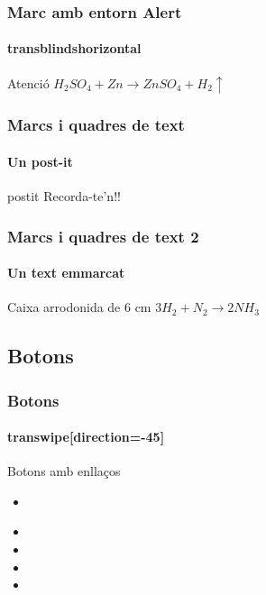 \documentclass[12pt]{beamer}
\begin{document}
\begin{frame}
  \frametitle{Marc amb entorn Alert}
    \framesubtitle{transblindshorizontal}

      \begin{alertblock}{Atenció}
           $H_2 SO_4 + Zn \rightarrow ZnSO_4 + H_2\uparrow $
      \end{alertblock}
\transblindshorizontal
\end{frame}

\begin{frame}
  \frametitle{Marcs i quadres de text}
    \framesubtitle{Un post-it}
      \begin{beamercolorbox}[sep=1em,wd=5cm,shadow=true,rounded=true]{postit}
            \centering            
            Recorda-te'n!!
      \end{beamercolorbox}
\end{frame}
     
\begin{frame}
  \frametitle{Marcs i quadres de text 2}
    \framesubtitle{Un text emmarcat}     
      \begin{beamerboxesrounded}[upper=block body,lower=block body,shadow=true,width=6cm]{Caixa arrodonida de 6 cm}
       \centering
             $3 H_2 + N_2 \rightarrow 2 NH_3$
      \end{beamerboxesrounded}

  \transwipe[direction=90]
\end{frame}


\subsection{Botons}
\begin{frame}
  \frametitle{Botons}
    \framesubtitle{transwipe[direction=-45]}
    \begin{block}{Botons amb enllaços}
           \begin{itemize}
					\item \href{http://phobos.xtec.cat/jqueralt}{}
		            \item {}
		            \item {}
		            \item {}
		            \item {}
		   \end{itemize}
	\end{block} 	
  \transwipe[direction=-45]
\end{frame}
\end{document}
